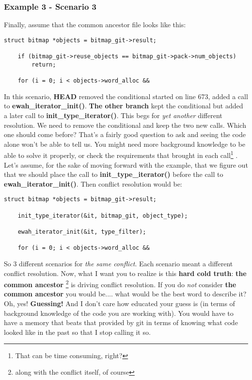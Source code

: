 \subsubsection{Example 3 - Scenario 3}
Finally, assume that the common ancestor file looks like this:

\begin{lstlisting}[style=c_style, firstnumber=671, caption={\bf example 3} - Scenario 3 - common ancestor code]
	struct bitmap *objects = bitmap_git->result;

	if (bitmap_git->reuse_objects == bitmap_git->pack->num_objects)
		return;

	for (i = 0; i < objects->word_alloc &&
\end{lstlisting}

In this scenario, {\bf HEAD} removed the conditional started on line 673, added a call to {\bf ewah\_iterator\_init()}.
{\bf The other branch} kept the conditional but added a later call to {\bf init\_type\_iterator()}. This begs for {\it yet another}
different resolution. We need to remove the conditional and keep the two new calls. Which one should come before? That's
a fairly good question to ask and seeing the code alone won't be able to tell us. You might need more background knowledge
to be able to solve it properly, or check the requirements that brought in each call\footnote{That can be time consuming, right?}
. Let's assume, for the sake of moving forward with the example, that we figure out that we should place the call
to {\bf init\_type\_iterator()} before the call to {\bf ewah\_iterator\_init()}. Then conflict resolution would be:

\begin{lstlisting}[style=c_style, firstnumber=671, caption={\bf example 3} - Scenario 3 - conflict resolution]
	struct bitmap *objects = bitmap_git->result;

	init_type_iterator(&it, bitmap_git, object_type);

	ewah_iterator_init(&it, type_filter);

	for (i = 0; i < objects->word_alloc &&
\end{lstlisting}

So 3 different scenarios for {\it the same conflict}. Each scenario meant a different conflict resolution. Now, what I want you
to realize is this {\bf hard cold truth}: {\bf the common ancestor} \footnote{along with the conflict itself, of course} is driving
conflict resolution. If you do {\it not} consider {\bf the common ancestor} you would be.... what would be the best word to describe
it? Oh, yes! {\bf Guessing!} And I don't care how educated your guess is (in terms of background knowledge of the code you are
working with). You would have to have a memory that beats that provided by git in terms of knowing what code looked like in the past
so that I stop calling it so.

